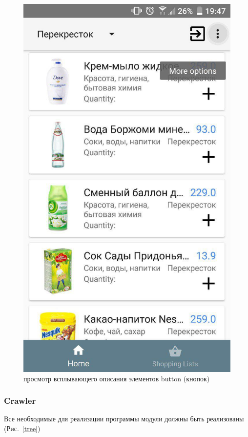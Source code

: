 \begin{figure}[h!]
    \includegraphics[height=0.38\textheight]{./screenshots/3/hint.jpg}
    \caption{\small{просмотр всплывающего описания элементов button (кнопок)}}
    \label{hint}
    \endminipage{}
\end{figure}

\newpage
\subsubsection{Crawler}
Все необходимые для реализации программы модули должны быть реализованы (Рис.~\ref{tree})

